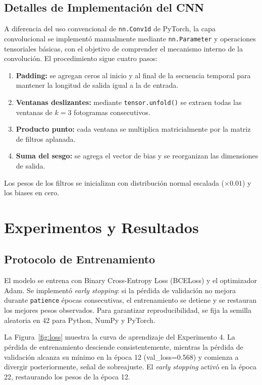 \documentclass[conference]{IEEEtran}
\begin{document}
\subsection{Detalles de Implementación del CNN}

A diferencia del uso convencional de \texttt{nn.Conv1d} de
PyTorch, la capa convolucional se implementó manualmente
mediante \texttt{nn.Parameter} y operaciones tensoriales
básicas, con el objetivo de comprender el mecanismo interno
de la convolución. El procedimiento sigue cuatro pasos:

\begin{enumerate}
  \item \textbf{Padding:} se agregan ceros al inicio y al
        final de la secuencia temporal para mantener la
        longitud de salida igual a la de entrada.
  \item \textbf{Ventanas deslizantes:} mediante
        \texttt{tensor.unfold()} se extraen todas las
        ventanas de $k=3$ fotogramas consecutivos.
  \item \textbf{Producto punto:} cada ventana se multiplica
        matricialmente por la matriz de filtros aplanada.
  \item \textbf{Suma del sesgo:} se agrega el vector de
        bias y se reorganizan las dimensiones de salida.
\end{enumerate}

Los pesos de los filtros se inicializan con distribución
normal escalada ($\times 0.01$) y los biases en cero.

\section{Experimentos y Resultados}
\label{sec:results}

\subsection{Protocolo de Entrenamiento}

El modelo se entrena con Binary Cross-Entropy Loss (BCELoss)
y el optimizador Adam. Se implementó \textit{early stopping}:
si la pérdida de validación no mejora durante \texttt{patience}
épocas consecutivas, el entrenamiento se detiene y se restauran
los mejores pesos observados. Para garantizar reproducibilidad,
se fija la semilla aleatoria en 42 para Python, NumPy y PyTorch.

La Figura~\ref{fig:loss} muestra la curva de aprendizaje del
Experimento 4. La pérdida de entrenamiento desciende
consistentemente, mientras la pérdida de validación alcanza su
mínimo en la época 12 (val\_loss=0.568) y comienza a divergir
posteriormente, señal de sobreajuste. El \textit{early stopping}
activó en la época 22, restaurando los pesos de la época 12.
\end{document}
